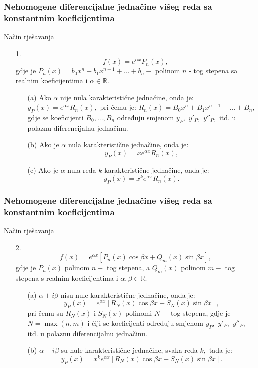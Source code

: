 \documentclass{beamer}
\begin{document}
\begin{frame}
\frametitle{Nehomogene diferencijalne jednačine višeg reda sa konstantnim koeficijentima} 
\begin{alertblock}{Način rješavanja}
\begin{enumerate}
    \item[1.] $$f(x) = e^{\alpha x}P_{n}(x), $$ gdje je $P_{n}(x)= b_{0}x^{n} + b_{1}x^{n-1} +...+ b_{n} - $ polinom $n$ - tog stepena sa realnim koeficijentima i $\alpha \in \mathbb{R}.$
    \begin{enumerate}
        \item [(a)] Ako  $\alpha$ nije nula karakteristične jednačine, onda je: $y_{P}(x) = e^{\alpha x}R_{n}(x), $ pri čemu je: $R_{n}(x) = B_{0}x^{n} + B_{1}x^{n-1} +...+ B_{n}, $ gdje se koeficijenti $B_{0},...,B_{n}$ određuju smjenom $y_{P}, $ $y'_{P}, $ $y''_{P}, $ itd. u polaznu diferencijalnu jednačinu.
        \item [(b)] Ako je $\alpha$  nula karakteristične jednačine, onda je: $$y_{P}(x) = xe^{\alpha x}R_{n}(x), $$ 
        \item [(c)] Ako je $\alpha$  nula reda $k$ karakteristične jednačine, onda je: $$y_{P}(x) = x^{k}e^{\alpha x}R_{n}(x).$$ 
    \end{enumerate}
    \end{enumerate}
    \end{alertblock}
    \end{frame}
    \begin{frame}
\frametitle{Nehomogene diferencijalne jednačine višeg reda sa konstantnim koeficijentima} 
\begin{alertblock}{Način rješavanja}
\begin{enumerate}
    \item[2.] $$f(x) = e^{\alpha x}[P_{n}(x) \cos{\beta x} + Q_{m}(x) \sin{\beta x}],  $$ gdje je $P_{n}(x)$   polinom $n - $  tog stepena, a $Q_{m}(x)$ polinom $m - $  tog stepena s realnim koeficijentima i $\alpha, \beta \in \mathbb{R}.$
    \begin{enumerate}
        \item [(a)] $\alpha \pm i \beta$ nisu nule karakteristične jednačine, onda je:
        $$y_{P}(x) = e^{\alpha x}[R_{N}(x) \cos{\beta x} + S_{N}(x) \sin{\beta x}], $$ 
                  pri čemu su $R_{N}(x)$ i $S_{N}(x)$ polinomi $N - $  tog stepena, gdje je $N = \max(n,m)$ i  čiji se koeficijenti određuju smjenom $y_{P}, $ $y'_{P}, $ $y''_{P}, $ itd. u polaznu diferencijalnu jednačinu.
        
            \item [ (b)]$\alpha \pm i \beta$ su nule karakteristične jednačine, svaka reda $k, $ tada je:
            $$y_P(x) =  x^{k}e^{\alpha x}[R_{N}(x) \cos{\beta x} + S_{N}(x) \sin{\beta x}]. $$ 
        \end{enumerate}
        \end{enumerate}
        \end{alertblock}
        \end{frame}
\end{document}
